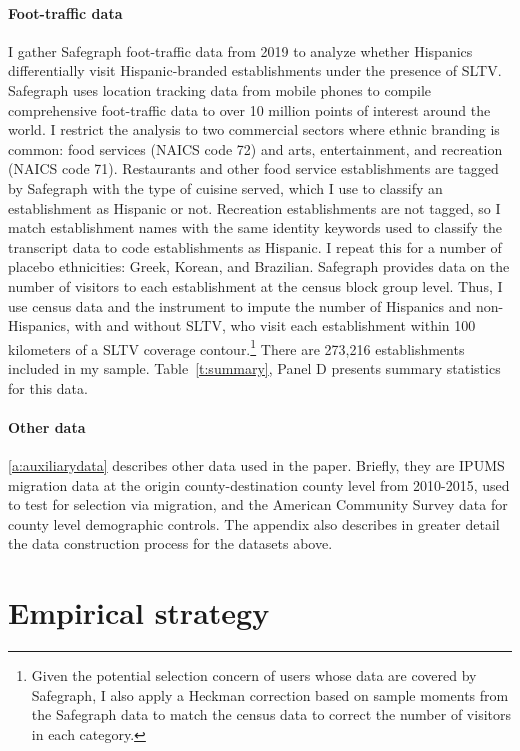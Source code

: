 \documentclass[11pt]{article}
\begin{document}
\paragraph{Foot-traffic data} I gather Safegraph foot-traffic data from 2019 to analyze whether Hispanics differentially visit Hispanic-branded establishments under the presence of SLTV. Safegraph uses location tracking data from mobile phones to compile comprehensive foot-traffic data to over 10 million points of interest around the world. I restrict the analysis to two commercial sectors where ethnic branding is common: food services (NAICS code 72) and arts, entertainment, and recreation (NAICS code 71). Restaurants and other food service establishments are tagged by Safegraph with the type of cuisine served, which I use to classify an establishment as Hispanic or not. Recreation establishments are not tagged, so I match establishment names with the same identity keywords used to classify the transcript data to code establishments as Hispanic. I repeat this for a number of placebo ethnicities: Greek, Korean, and Brazilian. Safegraph provides data on the number of visitors to each establishment at the census block group level. Thus, I use census data and the instrument to impute the number of Hispanics and non-Hispanics, with and without SLTV, who visit each establishment within 100 kilometers of a SLTV coverage contour.\footnote{ Given the potential selection concern of users whose data are covered by Safegraph, I also apply a Heckman correction based on sample moments from the Safegraph data to match the census data to correct the number of visitors in each category.} There are 273,216 establishments included in my sample. Table~\ref{t:summary}, Panel D presents summary statistics for this data. 

\paragraph{Other data} \ref{a:auxiliarydata} describes other data used in the paper. Briefly, they are IPUMS migration data at the origin county-destination county level from 2010-2015, used to test for selection via migration, and the American Community Survey data for county level demographic controls. The appendix also describes in greater detail the data construction process for the datasets above.



\section{Empirical strategy}\label{s:rd}
\end{document}
